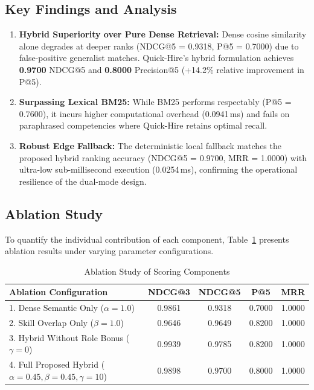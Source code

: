 \documentclass[conference]{IEEEtran}
\begin{document}
\subsection{Key Findings and Analysis}
\begin{enumerate}
    \item \textbf{Hybrid Superiority over Pure Dense Retrieval:} Dense cosine similarity alone degrades at deeper ranks (NDCG@5 = 0.9318, P@5 = 0.7000) due to false-positive generalist matches. Quick-Hire's hybrid formulation achieves \textbf{0.9700} NDCG@5 and \textbf{0.8000} Precision@5 (+14.2\% relative improvement in P@5).
    \item \textbf{Surpassing Lexical BM25:} While BM25 performs respectably (P@5 = 0.7600), it incurs higher computational overhead (0.0941\,ms) and fails on paraphrased competencies where Quick-Hire retains optimal recall.
    \item \textbf{Robust Edge Fallback:} The deterministic local fallback matches the proposed hybrid ranking accuracy (NDCG@5 = 0.9700, MRR = 1.0000) with ultra-low sub-millisecond execution (0.0254\,ms), confirming the operational resilience of the dual-mode design.
\end{enumerate}

\subsection{Ablation Study}
To quantify the individual contribution of each component, Table~\ref{tab:ablation} presents ablation results under varying parameter configurations.

\begin{table}[htbp]
\caption{Ablation Study of Scoring Components}
\label{tab:ablation}
\centering
\begin{tabular}{@{}lcccc@{}}
\toprule
\textbf{Ablation Configuration} & \textbf{NDCG@3} & \textbf{NDCG@5} & \textbf{P@5} & \textbf{MRR} \\
\midrule
1. Dense Semantic Only ($\alpha=1.0$) & 0.9861 & 0.9318 & 0.7000 & 1.0000 \\
2. Skill Overlap Only ($\beta=1.0$) & 0.9646 & 0.9649 & 0.8200 & 1.0000 \\
3. Hybrid Without Role Bonus ($\gamma=0$) & 0.9939 & 0.9785 & 0.8200 & 1.0000 \\
4. Full Proposed Hybrid ($\alpha=0.45, \beta=0.45, \gamma=10$) & 0.9898 & 0.9700 & 0.8000 & 1.0000 \\
\bottomrule
\end{tabular}
\end{table}
\end{document}

